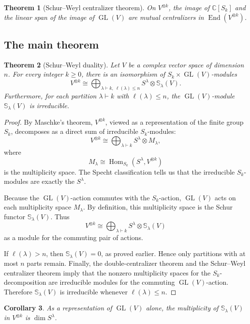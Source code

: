 \documentclass[12pt,a4paper]{article}
\newtheorem{theorem}{Theorem}[section]
\newtheorem{corollary}[theorem]{Corollary}
\theoremstyle{definition}
\theoremstyle{remark}
\newcommand{\C}{\mathbb{C}}
\newcommand{\GL}{\operatorname{GL}}
\newcommand{\End}{\operatorname{End}}
\newcommand{\Hom}{\operatorname{Hom}}
\newcommand{\Schur}[1]{\mathbb{S}_{#1}}
\begin{document}
\begin{theorem}[Schur--Weyl centralizer theorem]
On \(V^{\otimes k}\), the image of \(\C[S_k]\) and the linear span of the
image of \(\GL(V)\) are mutual centralizers in \(\End(V^{\otimes k})\).
\end{theorem}

\subsection{The main theorem}

\begin{theorem}[Schur--Weyl duality]
Let \(V\) be a complex vector space of dimension \(n\).  For every integer
\(k\ge 0\), there is an isomorphism of \(S_k\times \GL(V)\)-modules
\[
V^{\otimes k}
  \cong
  \bigoplus_{\lambda\vdash k,\ \ell(\lambda)\le n}
  S^\lambda\otimes \Schur{\lambda}(V).
\]
Furthermore, for each partition \(\lambda\vdash k\) with
\(\ell(\lambda)\le n\), the \(\GL(V)\)-module \(\Schur{\lambda}(V)\) is
irreducible.
\end{theorem}

\begin{proof}
By Maschke's theorem, \(V^{\otimes k}\), viewed as a representation of the
finite group \(S_k\), decomposes as a direct sum of irreducible
\(S_k\)-modules:
\[
V^{\otimes k}\cong \bigoplus_{\lambda\vdash k}S^\lambda\otimes M_\lambda,
\]
where
\[
M_\lambda\cong \Hom_{S_k}(S^\lambda,V^{\otimes k})
\]
is the multiplicity space.  The Specht classification tells us that the
irreducible \(S_k\)-modules are exactly the \(S^\lambda\).

Because the \(\GL(V)\)-action commutes with the \(S_k\)-action, \(\GL(V)\)
acts on each multiplicity space \(M_\lambda\).  By definition, this
multiplicity space is the Schur functor \(\Schur{\lambda}(V)\).  Thus
\[
V^{\otimes k}\cong
\bigoplus_{\lambda\vdash k}S^\lambda\otimes \Schur{\lambda}(V)
\]
as a module for the commuting pair of actions.

If \(\ell(\lambda)>n\), then \(\Schur{\lambda}(V)=0\), as proved earlier.
Hence only partitions with at most \(n\) parts remain.  Finally, the
double-centralizer theorem and the Schur--Weyl centralizer theorem imply that
the nonzero multiplicity spaces for the \(S_k\)-decomposition are
irreducible modules for the commuting \(\GL(V)\)-action.  Therefore
\(\Schur{\lambda}(V)\) is irreducible whenever \(\ell(\lambda)\le n\).
\end{proof}

\begin{corollary}
As a representation of \(\GL(V)\) alone, the multiplicity of
\(\Schur{\lambda}(V)\) in \(V^{\otimes k}\) is \(\dim S^\lambda\).
\end{corollary}
\end{document}
